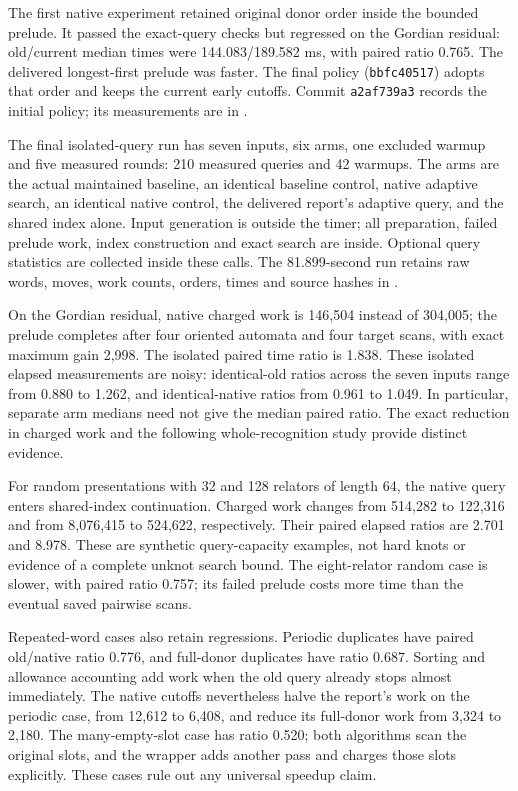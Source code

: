 The first native experiment retained original donor order inside the bounded
prelude. It passed the exact-query checks but regressed on the Gordian
residual: old/current median times were 144.083/189.582 ms, with paired ratio
0.765. The delivered longest-first prelude was faster. The final policy
(\texttt{bbfc40517}) adopts that order and keeps the current early cutoffs.
Commit \texttt{a2af739a3} records the initial policy; its measurements are in
.



The final isolated-query run has seven inputs, six arms, one excluded warmup
and five measured rounds: 210 measured queries and 42 warmups. The arms are
the actual maintained baseline, an identical baseline control, native
adaptive search, an identical native control, the delivered report's adaptive
query, and the shared index alone. Input generation is outside the timer;
all preparation, failed prelude work, index construction and exact search are
inside. Optional query statistics are collected inside these calls. The
81.899-second run retains raw words, moves, work counts, orders, times and
source hashes in .

On the Gordian residual, native charged work is 146,504 instead of 304,005;
the prelude completes after four oriented automata and four target scans,
with exact maximum gain 2,998. The isolated paired time ratio is 1.838.
These isolated elapsed measurements are noisy: identical-old ratios across
the seven inputs range from 0.880 to 1.262, and identical-native ratios from
0.961 to 1.049. In particular, separate arm medians need not give the median
paired ratio. The exact reduction in charged work and the following
whole-recognition study provide distinct evidence.

For random presentations with 32 and 128 relators of length 64, the native
query enters shared-index continuation. Charged work changes from
514,282 to 122,316 and from 8,076,415 to 524,622, respectively. Their paired
elapsed ratios are 2.701 and 8.978. These are synthetic query-capacity
examples, not hard knots or evidence of a complete unknot search bound.
The eight-relator random case is slower, with paired ratio 0.757; its failed
prelude costs more time than the eventual saved pairwise scans.

Repeated-word cases also retain regressions. Periodic duplicates have paired
old/native ratio 0.776, and full-donor duplicates have ratio 0.687. Sorting
and allowance accounting add work when the old query already stops almost
immediately. The native cutoffs nevertheless halve the report's work on the
periodic case, from 12,612 to 6,408, and reduce its full-donor work from 3,324
to 2,180. The many-empty-slot case has ratio 0.520; both algorithms scan the
original slots, and the wrapper adds another pass and charges those slots
explicitly. These cases rule out any universal speedup claim.

